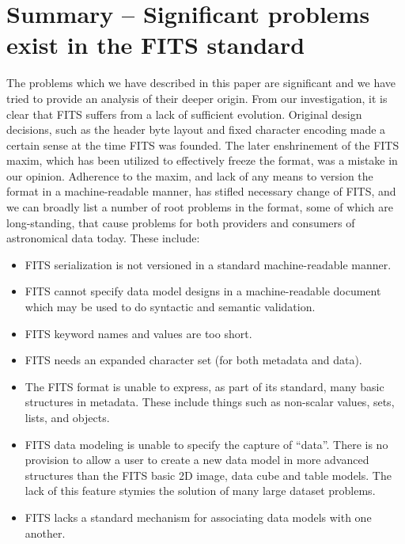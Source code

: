 \documentclass[final,authoryear,5p,times,twocolumn]{elsarticle}
\begin{document}
{{\section{Summary -- Significant problems exist in the FITS standard}


The problems which we have described in this paper are significant
and we have tried to provide an analysis of their deeper origin.
From our investigation, it is clear that FITS suffers from a lack of
sufficient evolution. Original design decisions, such as the header
byte layout and fixed character encoding made a certain sense at the
time FITS was founded. The later enshrinement of the FITS maxim, which
has
been utilized to effectively freeze the format, was a mistake in our
opinion.  Adherence to the maxim, and lack of any means to version
the format in a machine-readable manner, has stifled necessary change of
FITS, and we can broadly list a number of root problems in the format,
some of which are long-standing, that cause problems for both providers
and consumers of astronomical data today.  These include:

\begin{itemize}

\item FITS serialization is not versioned in a standard machine-readable manner.

\item FITS cannot specify data model designs in a machine-readable document
which may be used to do syntactic and semantic validation.

\item FITS keyword names and values are too short.

\item FITS needs an expanded character set (for both metadata and data).

\item The FITS format is unable to express, as part of its standard,
many basic structures in metadata. These include things such as non-scalar
values, sets, lists, and objects.

\item FITS data modeling is unable to specify the capture of ``data''.
There is no provision to allow a user to create a new data model in more
advanced structures than the FITS basic 2D image, data cube and table models.
The lack of this feature stymies the solution of many large dataset problems.

\item FITS lacks a standard mechanism for associating data models with one another.


\end{itemize}}}
\end{document}
